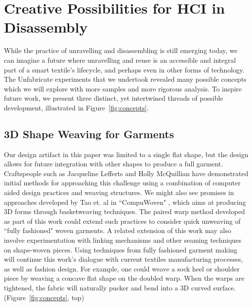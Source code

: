 
\section{Creative Possibilities for HCI in Disassembly} 
While the practice of unravelling and disassembling is still emerging today, we can imagine a future where unravelling and reuse is an accessible and integral part of a smart textile's lifecycle, and perhaps even in other forms of technology. The Unfabricate experiments that we undertook revealed many possible concepts which we will explore with more samples and more rigorous analysis. To inspire future work, we present three distinct, yet intertwined threads of possible development, illustrated in Figure~\ref{fig:concepts}.

\subsection{3D Shape Weaving for Garments}

Our design artifact in this paper was limited to a single flat shape, but the design allows for future integration with other shapes to produce a full garment. Craftspeople such as Jacqueline Lefferts \cite{lefferts_fullfashionedweaving} and Holly McQuillian \cite{mcquillan2019hybrid} have demonstrated initial methods for approaching this challenge using a combination of computer aided design practices and weaving structures. We might also see promises in approaches developed by Tao et. al in ``CompuWoven" \cite{tao_compuwoven:_2016}, which aims at producing 3D forms through basketweaving techniques. The paired warp method developed as part of this work could extend such practices to consider quick unweaving of ``fully fashioned" woven garments.  A related extension of this work may also involve experimentation with linking mechanisms and other seaming techniques on shape-woven pieces. Using techniques from fully fashioned garment making will continue this work's dialogue with current textiles manufacturing processes, as well as fashion design.  For example, one could weave a sock heel or shoulder piece by weaving a concave flat shape on the doubled warp. When the warps are tightened, the fabric will naturally pucker and bend into a 3D curved surface. (Figure~\ref{fig:concepts}, top)

